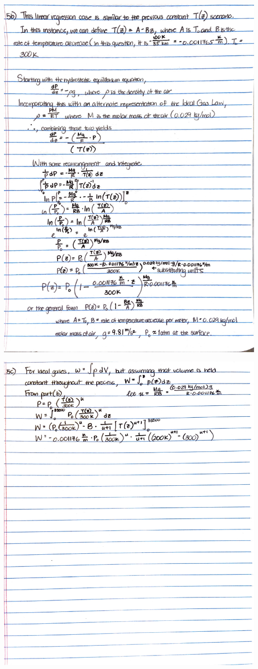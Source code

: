 \documentclass{homework}
\begin{document}
\begin{center}
    \includegraphics[width=15cm]{media/5b.JPG}
\end{center}
\begin{center}
    \includegraphics[width=15cm]{media/5c.JPG}
\end{center}


% 
% 
\end{document}
